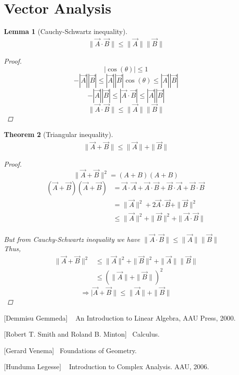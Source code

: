 \documentclass[paper=a4, fontsize=12pt]{scrartcl} %
\newtheorem{thm}{Theorem}[section]
\newtheorem{lem}[thm]{Lemma}
\theoremstyle{definition}
\numberwithin{equation}{section} %
\numberwithin{figure}{section} %
\numberwithin{table}{section} %
\begin{document}
\section{Vector Analysis}

\begin{lem}[Cauchy-Schwartz inequality]
\begin{align}
\|\vec{A}\cdot \vec{B}\|\leq \|\vec{A}\|\|\vec{B}\|
\end{align}
\begin{proof}
$$|\cos(\theta)|\leq 1$$
$$-|\vec{A}||\vec{B}|\leq |\vec{A}||\vec{B}|\cos(\theta) \leq |\vec{A}||\vec{B}|$$
$$-|\vec{A}||\vec{B}|\leq |\vec{A}\cdot \vec{B}|\leq |\vec{A}||\vec{B}|$$
$$\|\vec{A}\cdot \vec{B}\|\leq \|\vec{A}\|\|\vec{B}\|$$
\end{proof}
\end{lem}
\begin{thm}[Triangular inequality]
\begin{align}
\|\vec{A}+ \vec{B}\|\leq \|\vec{A}\|+\|\vec{B}\|
\end{align}
\begin{proof}
$$\|\vec{A}+ \vec{B}\|^2=(A+B)(A+B)$$
\begin{align*}
(\vec{A}+\vec{B})(\vec{A}+\vec{B})&=\vec{A}\cdot\vec{A}+\vec{A}\cdot\vec{B}+\vec{B}\cdot\vec{A}+\vec{B}\cdot\vec{B}\\
          &=\|\vec{A}\|^2+2\vec{A}\cdot \vec{B}+\|\vec{B}\|^2\\
          &\leq \|\vec{A}\|^2+\|\vec{B}\|^2+\|\vec{A}\cdot \vec{B}\|\\
\end{align*}

But from Cauchy-Schwartz inequality we have $ \|\vec{A}\cdot \vec{B}\|\leq \|\vec{A}\|\|\vec{B}\|$\\
Thus,
\begin{align*}
\|\vec{A}+ \vec{B}\|^2     &\leq \|\vec{A}\|^2+\|\vec{B}\|^2+\|\vec{A}\|\|\vec{B}\|\\
                           &\leq (\|\vec{A}\|+\|\vec{B}\|)^2
\end{align*}
$$ \Rightarrow |\vec{A}+ \vec{B}\|\leq \|\vec{A}\|+\|\vec{B}\| $$

\end{proof}

\end{thm}


\newpage

 \begin{thebibliography}{9}

[Demmisu Gemmeda] ~
An Introduction to Linear Algebra, AAU
Press, 2000.


[Robert T. Smith and Roland B. Minton]~
Calculus.

[Gerard Venema]~
Foundations of Geometry.


[Hunduma Legesse] ~
Introduction to Complex Analysis.
AAU, 2006.


\end{thebibliography}
\end{document}
